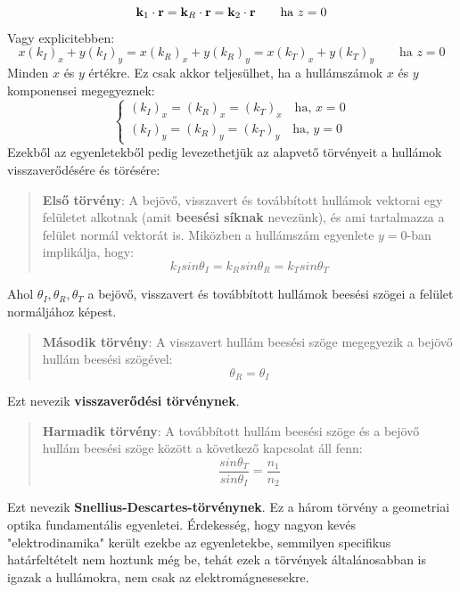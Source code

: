 \documentclass[../main.tex]{subfiles}
\begin{document}
\begin{equation}
    \bold{k}_1 \cdot \bold{r} = \bold{k}_R \cdot \bold{r} = \bold{k}_2 \cdot \bold{r} \qquad \text{ha } z = 0
\end{equation}
Vagy explicitebben:
\begin{equation}
    x(k_I)_x + y(k_I)_y = x(k_R)_x + y(k_R)_y = x(k_T)_x + y(k_T)_y \qquad \text{ha } z = 0
\end{equation}
Minden $x$ és $y$ értékre. Ez csak akkor teljesülhet, ha a hullámszámok $x$ és $y$ komponensei megegyeznek:
\begin{equation}
    \begin{cases}
        (k_I)_x = (k_R)_x = (k_T)_x \quad \text{ha, } x = 0\\
        (k_I)_y = (k_R)_y = (k_T)_y \quad \text{ha, } y = 0
    \end{cases}
\end{equation}
Ezekből az egyenletekből pedig levezethetjük az alapvető törvényeit a hullámok visszaverődésére és törésére:
\begin{quote}
     \textbf{Első törvény}: A bejövő, visszavert és továbbított hullámok vektorai egy felületet alkotnak (amit \textbf{beesési síknak} nevezünk), és ami tartalmazza a felület normál vektorát is. 
     Miközben a hullámszám egyenlete $y = 0$-ban implikálja, hogy:
        \begin{equation}
            k_I sin \theta_I = k_R sin \theta_R = k_T sin \theta_T
        \end{equation}
\end{quote}
Ahol $\theta_I, \theta_R, \theta_T$ a bejövő, visszavert és továbbított hullámok beesési szögei a felület normáljához képest.
\begin{quote}
    \textbf{Második törvény}: A visszavert hullám beesési szöge megegyezik a bejövő hullám beesési szögével:
        \begin{equation}
            \theta_R = \theta_I
        \end{equation}
\end{quote}
Ezt nevezik \textbf{visszaverődési törvénynek}.
\begin{quote}
    \textbf{Harmadik törvény}: A továbbított hullám beesési szöge és a bejövő hullám beesési szöge között a következő kapcsolat áll fenn:
        \begin{equation}
            \frac{sin \theta_T}{sin \theta_I} = \frac{n_1}{n_2}
        \end{equation}
\end{quote}
Ezt nevezik \textbf{Snellius-Descartes-törvénynek}. Ez a három törvény a geometriai optika fundamentális egyenletei. Érdekesség, hogy nagyon kevés "elektrodinamika" került ezekbe az egyenletekbe,
semmilyen specifikus határfeltételt nem hoztunk még be, tehát ezek a törvények általánosabban is igazak a hullámokra, nem csak az elektromágnesesekre.
\end{document}
